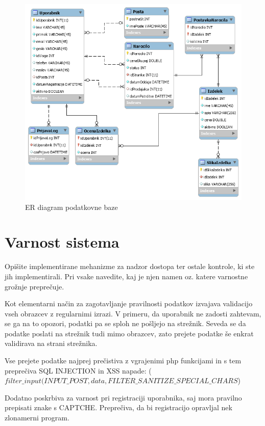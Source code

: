 \documentclass[a4paper,12pt]{report}
\begin{document}
\begin{figure}[htb]
	\centering
	\includegraphics[width=13cm]{img/er-trgovina.png}
	\caption{ER diagram podatkovne baze}
\label{fig:1}
\end{figure}

\chapter{Varnost sistema}

Opišite implementirane mehanizme za nadzor dostopa ter ostale kontrole, ki ste jih implementirali. Pri vsake navedite, kaj je njen namen oz. katere varnostne grožnje preprečuje.

Kot elementarni način za zagotavljanje pravilnosti podatkov izvajava validacijo vseh obrazcev z regularnimi izrazi. V primeru, da uporabnik ne zadosti zahtevam, se ga na to opozori, podatki pa se sploh ne pošljejo na strežnik. Seveda se da podatke poslati na strežnik tudi mimo obrazcev, zato prejete podatke še enkrat validirava na strani strežnika.

Vse prejete podatke najprej prečistiva z vgrajenimi php funkcijami in s tem preprečiva SQL INJECTION in XSS napade:\newline
($filter\_input(INPUT\_POST, data, FILTER\_SANITIZE\_SPECIAL\_CHARS$)

Dodatno poskrbiva za varnost pri registraciji uporabnika, saj mora pravilno prepisati znake s CAPTCHE. Preprečiva, da bi registracijo opravljal nek zlonamerni program.
\end{document}

